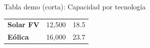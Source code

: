 \documentclass{sener2025}
\begin{document}
\begin{tabladoradoCorto}
  \caption{Tabla demo (corta): Capacidad por tecnología}
  \label{tab:tabla_demo__corta___capacidad_}
  \begin{tabular}{H{3cm}G{2cm}G{2cm}}
    \toprule
      &  &  \\
    \midrule
    \textbf{Solar FV} & 12,500 & 18.5 \\
    \textbf{Eólica} & 16,000 & 23.7 \\
    \bottomrule
  \end{tabular}
\end{tabladoradoCorto}
\vspace{-4pt}
\end{document}
